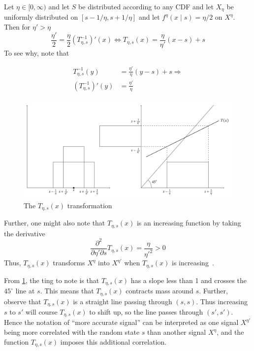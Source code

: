 \documentclass[11pt,a4paper,oneside]{article}
\begin{document}
\begin{example}\label{ex:t-transformation-1}
Let  \(\eta\in[0,\infty)\) and let \(S\) be distributed according to any CDF and let \(X_{\eta}\) be uniformly distributed on \([s-1/\eta,s+1/\eta]\) and let \(f^\eta(x\mid s)=\eta\big /2\) on \(X^\eta\). Then for \(\eta'>\eta\)
\[
	\frac{\eta'}{2}=\frac{\eta}{2}\left(T_{\eta,s}^{-1}\right)'(x)\Leftrightarrow T_{\eta,s}(x)=\frac{\eta}{\eta'}(x-s)+s
\]
To see why, note that

\begin{align*}
	T^{-1}_{\eta,s}(y)               &=\frac{\eta'}{\eta}(y-s)+s \Rightarrow \\
	\left(T^{-1}_{\eta,s}\right)'(y) &=\frac{\eta'}{\eta}
\end{align*}

\begin{figure}
	\includegraphics[width=\textwidth]{t-transformation.pdf}
	\caption{\label{fig:t-transformation}The \(T_{\eta,s}(x)\) transformation}
\end{figure}

Further, one might also note that \(T_{\eta,s}(x)\) is an increasing function by taking the derivative
\[
	\frac{\partial^2}{\partial \eta'\partial s}T_{\eta,s}(x)=\frac{\eta}{\eta'^2}>0
\]
Thus, \(T_{\eta,s}(x)\) transforms \(X^{\eta}\) into \(X^{\eta'}\) when \(T_{\eta,s}(x)\) is increasing~\citep{Persico1996}.

From \cref{fig:t-transformation}, the ting to note is that \(T_{\eta,s}(x)\) has a slope less than 1 and crosses the \(45^\circ\) line at \(s\). This means that \(T_{\eta,s}(x)\) contracts mass around \(s\). Further, observe that \(T_{\eta,s}(x)\) is a straight line passing through \((s,s)\). Thus increasing \(s\) to \(s'\) will course \(T_{\eta,s}(x)\) to shift up, so the line passes through \((s',s')\). Hence the notation of ``more accurate signal'' can be interpreted as one signal \(X^{\eta'}\) being more correlated with the random state \(s\) than another signal \(X^\eta\), and the function \(T_{\eta,s}(x)\) imposes this additional correlation.
\end{example}
\end{document}
